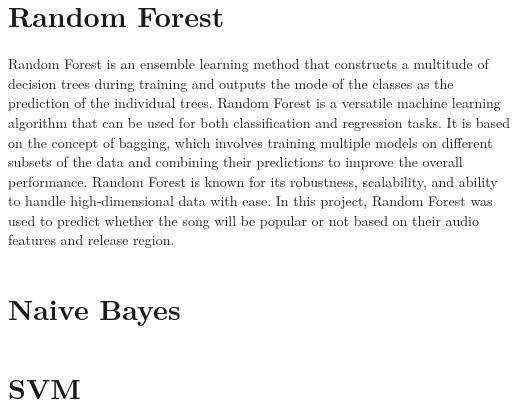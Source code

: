 \section{Random Forest}
Random Forest is an ensemble learning method that constructs a multitude of decision trees during
training and outputs the mode of the classes as the prediction of the individual trees. Random Forest
is a versatile machine learning algorithm that can be used for both classification and regression
tasks. It is based on the concept of bagging, which involves training multiple models on different
subsets of the data and combining their predictions to improve the overall performance. Random Forest
is known for its robustness, scalability, and ability to handle high-dimensional data with ease.
In this project, Random Forest was used to predict whether the song will be popular or not based on their audio
features and release region. \\





\section{Naive Bayes}

\section{SVM}